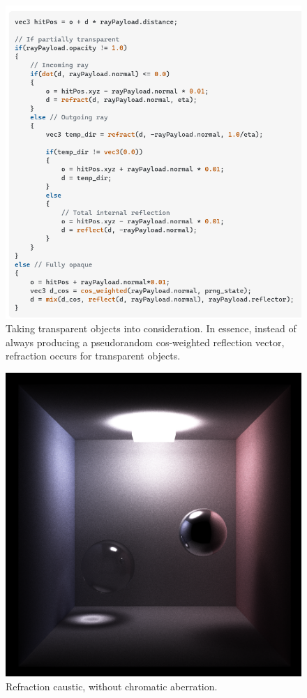 \documentclass[12pt]{article}
\begin{document}
\begin{figure} 
\centering
  \includegraphics[width = 6 in]{code.png}
  \caption{ Taking transparent objects into consideration.
In essence, instead of always producing a pseudorandom cos-weighted reflection vector, refraction occurs for transparent objects.
}
\end{figure}

\begin{figure} 
\centering
  \includegraphics[width = 6 in]{v_rt_reflect_no_chromatic_aberration_low_res.png}
  \caption{ Refraction caustic, without chromatic aberration.
}
\end{figure}
\end{document}
